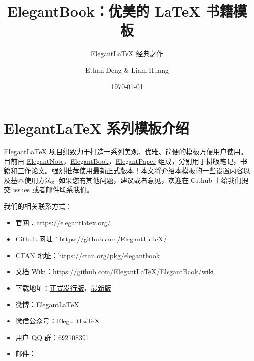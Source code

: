 \documentclass[cn,11pt]{elegantbook}
\title{ElegantBook：优美的 \LaTeX{} 书籍模板}
\subtitle{Elegant\LaTeX{} 经典之作}
\author{Ethan Deng \& Liam Huang}
\institute{Elegant\LaTeX{} Program}
\date{\today}
\begin{document}
\maketitle
\tableofcontents


\mainmatter
\hypersetup{pageanchor=true}

\chapter{Elegant\LaTeX{} 系列模板介绍}


Elegant\LaTeX{} 项目组致力于打造一系列美观、优雅、简便的模板方便用户使用。目前由 \href{https://github.com/ElegantLaTeX/ElegantNote}{ElegantNote}，\href{https://github.com/ElegantLaTeX/ElegantBook}{ElegantBook}，\href{https://github.com/ElegantLaTeX/ElegantPaper}{ElegantPaper} 组成，分别用于排版笔记，书籍和工作论文。强烈推荐使用最新正式版本！本文将介绍本模板的一些设置内容以及基本使用方法。如果您有其他问题，建议或者意见，欢迎在 Github 上给我们提交 \href{https://github.com/ElegantLaTeX/ElegantBook/issues}{issues} 或者邮件联系我们。

我们的相关联系方式：
\begin{itemize}
\item 官网：\href{https://elegantlatex.org/}{https://elegantlatex.org/}
\item Github 网址：\href{https://github.com/ElegantLaTeX/}{https://github.com/ElegantLaTeX/}
\item CTAN 地址：\href{https://ctan.org/pkg/elegantbook}{https://ctan.org/pkg/elegantbook}
\item 文档 Wiki：\href{https://github.com/ElegantLaTeX/ElegantBook/wiki}{https://github.com/ElegantLaTeX/ElegantBook/wiki}
\item 下载地址：\href{https://github.com/ElegantLaTeX/ElegantBook/releases}{正式发行版}，\href{https://github.com/ElegantLaTeX/ElegantBook/archive/master.zip}{最新版}
\item 微博：ElegantLaTeX
\item 微信公众号：ElegantLaTeX
\item 用户 QQ 群：692108391 
\item 邮件：
\end{itemize}
\end{document}
